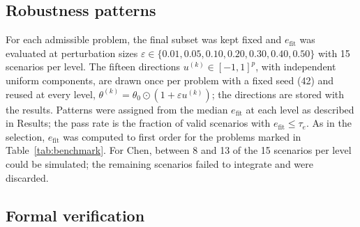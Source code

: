 \documentclass[pdflatex,sn-nature]{sn-jnl}
\theoremstyle{plain}
\begin{document}
\subsection*{Robustness patterns}

For each admissible problem, the final subset was kept fixed and $e_{\mathrm{fit}}$ was evaluated at perturbation sizes $\varepsilon\in\{0.01,0.05,0.10,0.20,0.30,0.40,0.50\}$ with 15 scenarios per level. The fifteen directions $u^{(k)}\in[-1,1]^p$, with independent uniform components, are drawn once per problem with a fixed seed (42) and reused at every level, $\theta^{(k)}=\theta_0\odot(1+\varepsilon u^{(k)})$; the directions are stored with the results. Patterns were assigned from the median $e_{\mathrm{fit}}$ at each level as described in Results; the pass rate is the fraction of valid scenarios with $e_{\mathrm{fit}}\le\tau_e$. As in the selection, $e_{\mathrm{fit}}$ was computed to first order for the problems marked in Table~\ref{tab:benchmark}. For Chen, between 8 and 13 of the 15 scenarios per level could be simulated; the remaining scenarios failed to integrate and were discarded.

\subsection*{Formal verification}
\end{document}
